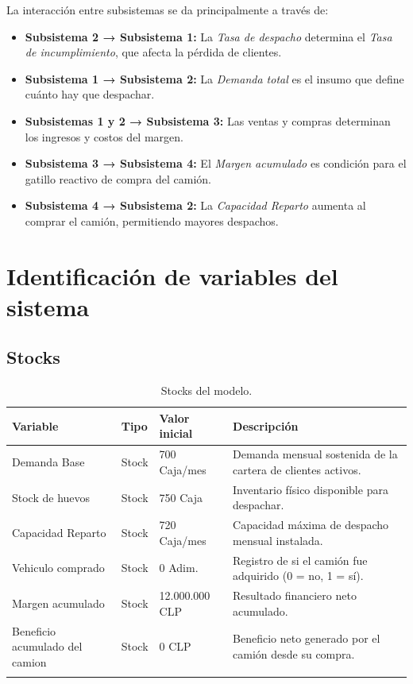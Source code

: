 \documentclass[10pt,a4paper]{article}
\begin{document}
La interacción entre subsistemas se da principalmente a través de:

\begin{itemize}
  \item \textbf{Subsistema 2 → Subsistema 1:} La \textit{Tasa de despacho} determina el \textit{Tasa de incumplimiento}, que afecta la pérdida de clientes.
  \item \textbf{Subsistema 1 → Subsistema 2:} La \textit{Demanda total} es el insumo que define cuánto hay que despachar.
  \item \textbf{Subsistemas 1 y 2 → Subsistema 3:} Las ventas y compras determinan los ingresos y costos del margen.
  \item \textbf{Subsistema 3 → Subsistema 4:} El \textit{Margen acumulado} es condición para el gatillo reactivo de compra del camión.
  \item \textbf{Subsistema 4 → Subsistema 2:} La \textit{Capacidad Reparto} aumenta al comprar el camión, permitiendo mayores despachos.
\end{itemize}

\newpage

\section{Identificación de variables del sistema}

\subsection{Stocks}

\begin{longtable}{>{\ttfamily}p{4.5cm} p{2cm} p{2cm} p{5.5cm}}
\toprule
Variable & Tipo & Valor inicial & Descripción \\
\midrule
\endhead
Demanda Base & Stock & 700 Caja/mes & Demanda mensual sostenida de la cartera de clientes activos. \\[4pt]
Stock de huevos & Stock & 750 Caja & Inventario físico disponible para despachar. \\[4pt]
Capacidad Reparto & Stock & 720 Caja/mes & Capacidad máxima de despacho mensual instalada. \\[4pt]
Vehiculo comprado & Stock & 0 Adim. & Registro de si el camión fue adquirido (0 = no, 1 = sí). \\[4pt]
Margen acumulado & Stock & 12.000.000 CLP & Resultado financiero neto acumulado. \\[4pt]
Beneficio acumulado del camion & Stock & 0 CLP & Beneficio neto generado por el camión desde su compra. \\
\bottomrule
\caption{Stocks del modelo.}
\end{longtable}
\end{document}
